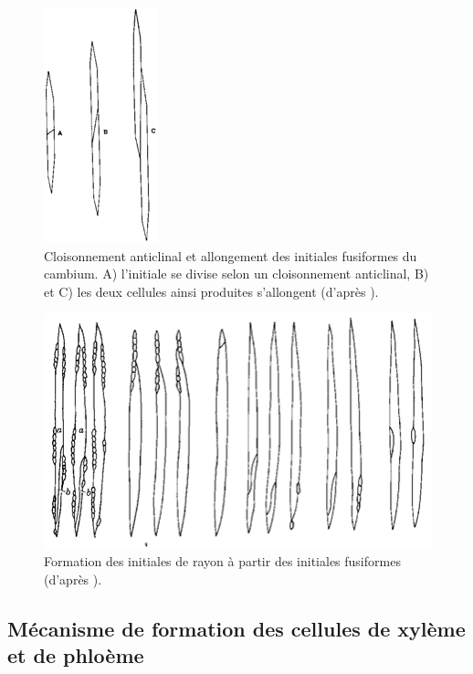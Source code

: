 \begin{figure}[h]
\centering
\includegraphics[scale=0.7]{img/ch5_elongation}
\caption{Cloisonnement anticlinal et allongement des initiales fusiformes du cambium. A) l'initiale se divise selon un cloisonnement anticlinal, B) et C) les deux cellules ainsi produites s'allongent (d'après \cite{jane1970structure}).}
\label{fig:elongation}
\end{figure}

\begin{figure}[h]
\centering
\includegraphics[scale=0.7]{img/ch5_init_rayons}
\caption{Formation des initiales de rayon à partir des initiales fusiformes (d'après \cite{panshin1980textbook}).}
\label{fig:init_rayons}
\end{figure}

\subsection{Mécanisme de formation des cellules de xylème et de phloème}

